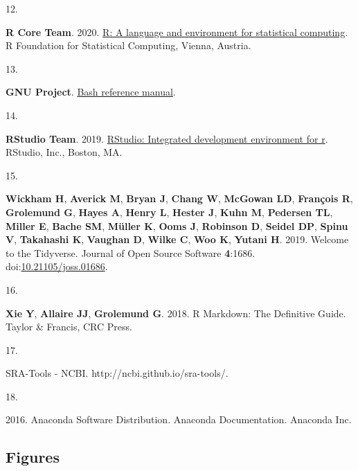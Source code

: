 \documentclass[
]{article}
\newlength{\cslhangindent}
\newlength{\csllabelwidth}
\newlength{\cslentryspacingunit} %
\newenvironment{CSLReferences}[2] %
 {%
  \setlength{\parindent}{0pt}
  \ifodd #1
  \let\oldpar\par
  \def\par{\hangindent=\cslhangindent\oldpar}
  \fi
  \setlength{\parskip}{#2\cslentryspacingunit}
 }%
 {}
\newcommand{\CSLLeftMargin}[1]{\parbox[t]{\csllabelwidth}{#1}}
\newcommand{\CSLRightInline}[1]{\parbox[t]{\linewidth - \csllabelwidth}{#1}\break}
\begin{document}
\begin{CSLReferences}{0}{1}
\leavevmode{}%
\CSLLeftMargin{12. }%
\CSLRightInline{\textbf{R Core Team}. 2020.
\href{https://www.R-project.org/}{R: A language and environment for
statistical computing}. R Foundation for Statistical Computing, Vienna,
Austria.}

\leavevmode{}%
\CSLLeftMargin{13. }%
\CSLRightInline{\textbf{GNU Project}.
\href{https://www.gnu.org/software/bash/\%20manual/bash.html/}{Bash
reference manual}.}

\leavevmode{}%
\CSLLeftMargin{14. }%
\CSLRightInline{\textbf{RStudio Team}. 2019.
\href{http://www.rstudio.com/}{RStudio: Integrated development
environment for r}. RStudio, Inc., Boston, MA.}

\leavevmode{}%
\CSLLeftMargin{15. }%
\CSLRightInline{\textbf{Wickham H}, \textbf{Averick M}, \textbf{Bryan
J}, \textbf{Chang W}, \textbf{McGowan LD}, \textbf{François R},
\textbf{Grolemund G}, \textbf{Hayes A}, \textbf{Henry L}, \textbf{Hester
J}, \textbf{Kuhn M}, \textbf{Pedersen TL}, \textbf{Miller E},
\textbf{Bache SM}, \textbf{Müller K}, \textbf{Ooms J}, \textbf{Robinson
D}, \textbf{Seidel DP}, \textbf{Spinu V}, \textbf{Takahashi K},
\textbf{Vaughan D}, \textbf{Wilke C}, \textbf{Woo K}, \textbf{Yutani H}.
2019. Welcome to the Tidyverse. Journal of Open Source Software
\textbf{4}:1686.
doi:\href{https://doi.org/10.21105/joss.01686}{10.21105/joss.01686}.}

\leavevmode{}%
\CSLLeftMargin{16. }%
\CSLRightInline{\textbf{Xie Y}, \textbf{Allaire JJ}, \textbf{Grolemund
G}. 2018. R {Markdown}: {The Definitive Guide}. {Taylor \& Francis, CRC
Press}.}

\leavevmode{}%
\CSLLeftMargin{17. }%
\CSLRightInline{{SRA}-{Tools} - {NCBI}.
http://ncbi.github.io/sra-tools/.}

\leavevmode{}%
\CSLLeftMargin{18. }%
\CSLRightInline{2016. Anaconda {Software Distribution}. Anaconda
Documentation. Anaconda Inc.}

\end{CSLReferences}

\setlength{\parindent}{0in}
\setlength{\leftskip}{0in}

\newpage

\hypertarget{figures}{%
\subsection{Figures}\label{figures}}
\end{document}
